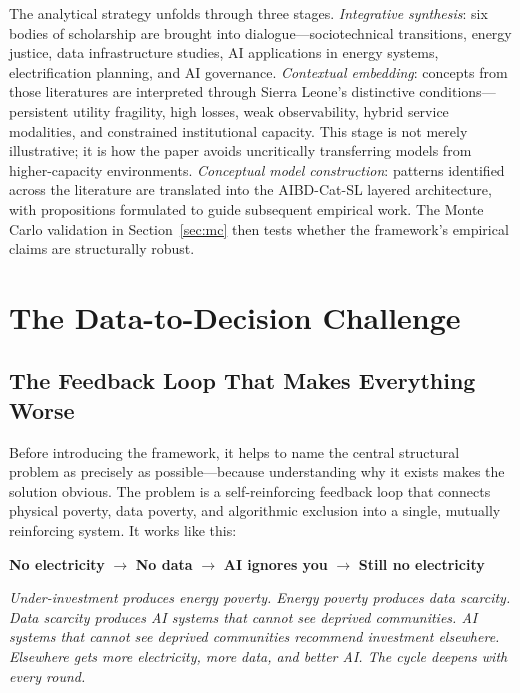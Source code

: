 \documentclass[preprint,12pt]{elsarticle}
\begin{document}
The analytical strategy unfolds through three stages.
\textit{Integrative synthesis}: six bodies of scholarship are
brought into dialogue---sociotechnical transitions, energy justice,
data infrastructure studies, AI applications in energy systems,
electrification planning, and AI governance. \textit{Contextual
embedding}: concepts from those literatures are interpreted through
Sierra Leone's distinctive conditions---persistent utility fragility,
high losses, weak observability, hybrid service modalities, and
constrained institutional capacity. This stage is not merely
illustrative; it is how the paper avoids uncritically transferring
models from higher-capacity environments. \textit{Conceptual model
construction}: patterns identified across the literature are
translated into the AIBD-Cat-SL layered architecture, with
propositions formulated to guide subsequent empirical work.
The Monte Carlo validation in Section~\ref{sec:mc} then tests
whether the framework's empirical claims are structurally robust.

\section{The Data-to-Decision Challenge}
\label{sec:challenge}

\subsection{The Feedback Loop That Makes Everything Worse}

Before introducing the framework, it helps to name the central
structural problem as precisely as possible---because understanding
why it exists makes the solution obvious. The problem is a
self-reinforcing feedback loop that connects physical poverty,
data poverty, and algorithmic exclusion into a single,
mutually reinforcing system. It works like this:

\begin{tcolorbox}[loopbox]
\centering\large
\textbf{\textcolor{loopRed}{No electricity}}
\hspace{0.5em}
\textcolor{loopOrange}{$\boldsymbol{\longrightarrow}$}
\hspace{0.5em}
\textbf{\textcolor{loopRed}{No data}}
\hspace{0.5em}
\textcolor{loopOrange}{$\boldsymbol{\longrightarrow}$}
\hspace{0.5em}
\textbf{\textcolor{loopRed}{AI ignores you}}
\hspace{0.5em}
\textcolor{loopOrange}{$\boldsymbol{\longrightarrow}$}
\hspace{0.5em}
\textbf{\textcolor{loopRed}{Still no electricity}}

\medskip
{\small\itshape\textcolor{hdramber}{
Under-investment produces energy poverty. Energy poverty
produces data scarcity. Data scarcity produces AI systems that
cannot see deprived communities. AI systems that cannot see
deprived communities recommend investment elsewhere.
Elsewhere gets more electricity, more data, and better AI.
The cycle deepens with every round.}}
\end{tcolorbox}
\end{document}
